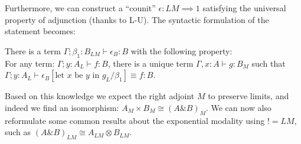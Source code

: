\documentclass[a4paper,english]{lipics-v2018}
\begin{document}
Furthermore, we can construct a ``counit'' $\epsilon : LM \implies 1$ satisfying the universal property of adjunction (thanks to L-U). The syntactic formulation of the statement becomes:
\begin{theorem}[$L \dashv M$]
There is a term $\Gamma; \beta_1 : B_{LM} \vdash \epsilon_B: B$ with the following property:\\
For any term: $\Gamma; y : A_L \vdash f : B$, there is a unique term $\Gamma, x : A \vdash g : B_{M}$ such that $\Gamma; y : A_L \vdash \epsilon_B[\text{let $x$ be $y$ in }g_L/\beta_1] \equiv f : B$.
\end{theorem}
 Based on this knowledge we expect the right adjoint $M$ to preserve limits, and indeed we find an isomorphism: $A_M \times B_M \cong (A \& B)_M$.
We can now also reformulate some common results about the exponential modality using $! = LM$, such as $(A \& B)_{LM} \cong A_{LM} \otimes B_{LM}$.
\end{document}
